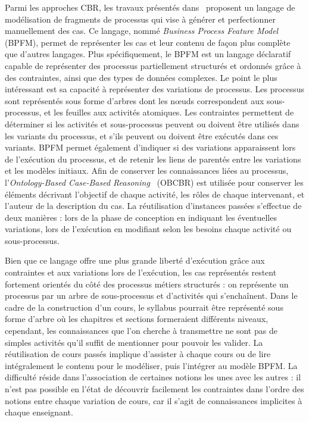 Parmi les approches CBR, les travaux présentés dans~\cite{cognini2016case} proposent un langage de modélisation de fragments de processus qui vise à générer et perfectionner manuellement des cas.
Ce langage, nommé \textit{Business Process Feature Model} (BPFM), permet de représenter les cas et leur contenu de façon plus complète que d'autres langages.
Plus spécifiquement, le BPFM est un langage déclaratif capable de représenter des processus partiellement structurés et ordonnés grâce à des contraintes, ainsi que des types de données complexes.
Le point le plus intéressant est sa capacité à représenter des variations de processus.
Les processus sont représentés sous forme d'arbres dont les n\oe{}uds correspondent aux sous-processus, et les feuilles aux activités atomiques.
Les contraintes permettent de déterminer si les activités et sous-processus peuvent ou doivent être utilisés dans les variants du processus, et s'ils peuvent ou doivent être exécutés dans ces variants.
BPFM permet également d'indiquer si des variations apparaissent lors de l'exécution du processus, et de retenir les liens de parentés entre les variations et les modèles initiaux.
Afin de conserver les connaissances liées au processus, l'\textit{Ontology-Based Case-Based Reasoning}~\cite{martin2013integrating} (OBCBR) est utilisée pour conserver les éléments décrivant l'objectif de chaque activité, les rôles de chaque intervenant, et l'auteur de la description du cas.
La réutilisation d'instances passées s'effectue de deux manières : lors de la phase de conception en indiquant les éventuelles variations, lors de l'exécution en modifiant selon les besoins chaque activité ou sous-processus.

Bien que ce langage offre une plus grande liberté d'exécution grâce aux contraintes et aux variations lors de l'exécution, les cas représentés restent fortement orientés du côté des processus métiers structurés : on représente un processus par un arbre de sous-processus et d'activités qui s'enchaînent.
Dans le cadre de la construction d'un cours, le syllabus pourrait être représenté sous forme d'arbre où les chapitres et sections formeraient différents niveaux, cependant, les connaissances que l'on cherche à transmettre ne sont pas de simples activités qu'il suffit de mentionner pour pouvoir les valider.
La réutilisation de cours passés implique d'assister à chaque cours ou de lire intégralement le contenu pour le modéliser, puis l'intégrer au modèle BPFM.
La difficulté réside dans l'association de certaines notions les unes avec les autres : il n'est pas possible en l'état de découvrir facilement les contraintes dans l'ordre des notions entre chaque variation de cours, car il s'agit de connaissances implicites à chaque enseignant.

